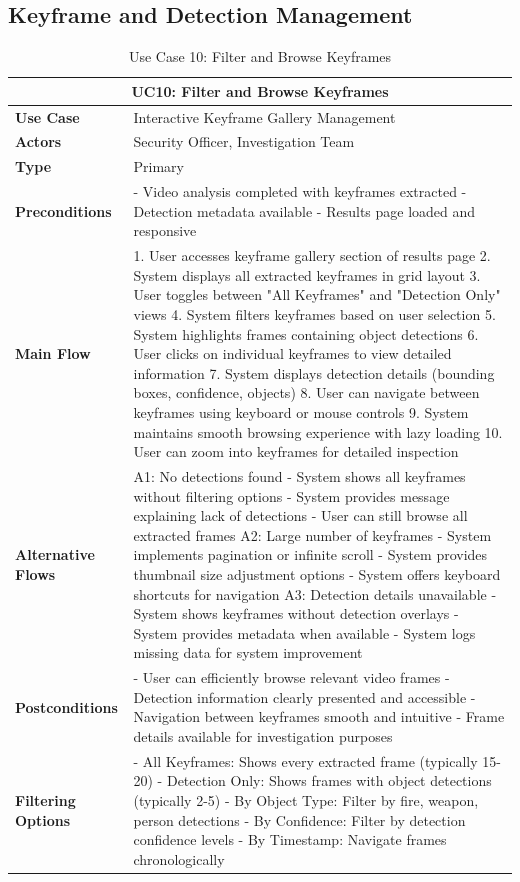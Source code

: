 \documentclass{article}
\begin{document}
\subsection{Keyframe and Detection Management}

\begin{table}[H]
\centering
\begin{tabularx}{\textwidth}{|l|X|}
\hline
\multicolumn{2}{|c|}{\textbf{UC10: Filter and Browse Keyframes}} \\ \hline
\textbf{Use Case} & Interactive Keyframe Gallery Management \\ \hline
\textbf{Actors} & Security Officer, Investigation Team \\ \hline
\textbf{Type} & Primary \\ \hline
\textbf{Preconditions} & 
- Video analysis completed with keyframes extracted
- Detection metadata available
- Results page loaded and responsive \\ \hline
\textbf{Main Flow} & 
1. User accesses keyframe gallery section of results page
2. System displays all extracted keyframes in grid layout
3. User toggles between "All Keyframes" and "Detection Only" views
4. System filters keyframes based on user selection
5. System highlights frames containing object detections
6. User clicks on individual keyframes to view detailed information
7. System displays detection details (bounding boxes, confidence, objects)
8. User can navigate between keyframes using keyboard or mouse controls
9. System maintains smooth browsing experience with lazy loading
10. User can zoom into keyframes for detailed inspection \\ \hline
\textbf{Alternative Flows} & 
A1: No detections found
- System shows all keyframes without filtering options
- System provides message explaining lack of detections
- User can still browse all extracted frames
A2: Large number of keyframes
- System implements pagination or infinite scroll
- System provides thumbnail size adjustment options
- System offers keyboard shortcuts for navigation
A3: Detection details unavailable
- System shows keyframes without detection overlays
- System provides metadata when available
- System logs missing data for system improvement \\ \hline
\textbf{Postconditions} & 
- User can efficiently browse relevant video frames
- Detection information clearly presented and accessible
- Navigation between keyframes smooth and intuitive
- Frame details available for investigation purposes \\ \hline
\textbf{Filtering Options} & 
- All Keyframes: Shows every extracted frame (typically 15-20)
- Detection Only: Shows frames with object detections (typically 2-5)
- By Object Type: Filter by fire, weapon, person detections
- By Confidence: Filter by detection confidence levels
- By Timestamp: Navigate frames chronologically \\ \hline
\end{tabularx}
\caption{Use Case 10: Filter and Browse Keyframes}
\end{table}
\end{document}
